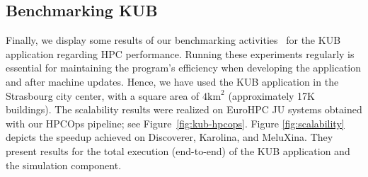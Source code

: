 \documentclass[runningheads]{llncs}
\begin{document}
\subsection{Benchmarking KUB}

Finally, we display some results of our benchmarking activities~\cite{hidalgo2_d31_2024} for the KUB application regarding HPC performance. Running these experiments regularly is essential for maintaining the program's efficiency when developing the application and after machine updates. 
Hence, we have used the KUB application in the Strasbourg city center, with a square area of $4 \mathrm{km}^2$ (approximately 17K buildings). The scalability results were realized on EuroHPC JU systems obtained with our HPCOps pipeline; see Figure~\ref{fig:kub-hpcops}. Figure \ref{fig:scalability} depicts the speedup achieved on Discoverer, Karolina, and MeluXina. They present results for the total execution (end-to-end) of the KUB application and the simulation component.
\end{document}
